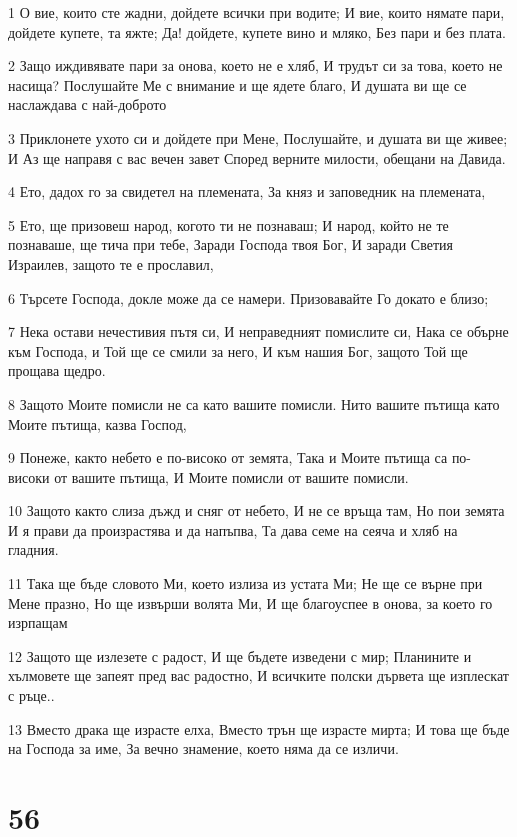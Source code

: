 \par 1 О вие, които сте жадни, дойдете всички при водите; И вие, които нямате пари, дойдете купете, та яжте; Да! дойдете, купете вино и мляко, Без пари и без плата.
\par 2 Защо иждивявате пари за онова, което не е хляб, И трудът си за това, което не насища? Послушайте Ме с внимание и ще ядете благо, И душата ви ще се наслаждава с най-доброто
\par 3 Приклонете ухото си и дойдете при Мене, Послушайте, и душата ви ще живее; И Аз ще направя с вас вечен завет Според верните милости, обещани на Давида.
\par 4 Ето, дадох го за свидетел на племената, За княз и заповедник на племената,
\par 5 Ето, ще призовеш народ, когото ти не познаваш; И народ, който не те познаваше, ще тича при тебе, Заради Господа твоя Бог, И заради Светия Израилев, защото те е прославил,
\par 6 Търсете Господа, докле може да се намери. Призовавайте Го докато е близо;
\par 7 Нека остави нечестивия пътя си, И неправедният помислите си, Нака се обърне към Господа, и Той ще се смили за него, И към нашия Бог, защото Той ще прощава щедро.
\par 8 Защото Моите помисли не са като вашите помисли. Нито вашите пътища като Моите пътища, казва Господ,
\par 9 Понеже, както небето е по-високо от земята, Така и Моите пътища са по-високи от вашите пътища, И Моите помисли от вашите помисли.
\par 10 Защото както слиза дъжд и сняг от небето, И не се връща там, Но пои земята И я прави да произрастява и да напъпва, Та дава семе на сеяча и хляб на гладния.
\par 11 Така ще бъде словото Ми, което излиза из устата Ми; Не ще се върне при Мене празно, Но ще извърши волята Ми, И ще благоуспее в онова, за което го изрпащам
\par 12 Защото ще излезете с радост, И ще бъдете изведени с мир; Планините и хълмовете ще запеят пред вас радостно, И всичките полски дървета ще изплескат с ръце..
\par 13 Вместо драка ще израсте елха, Вместо трън ще израсте мирта; И това ще бъде на Господа за име, За вечно знамение, което няма да се изличи.

\chapter{56}

